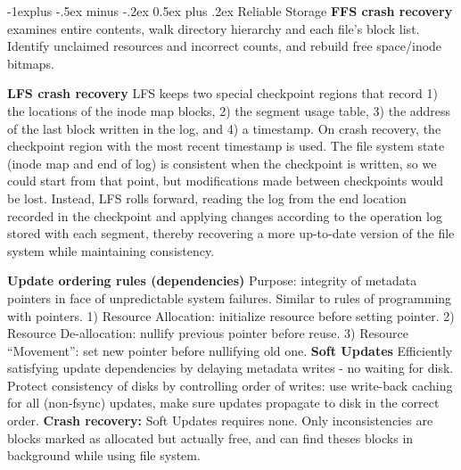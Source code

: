 \documentclass[6pt,landscape]{article}
\makeatletter
\renewcommand{\subsection}{\@startsection{subsection}{2}{0mm}%
                                {-1explus -.5ex minus -.2ex}%
                                {0.5ex plus .2ex}%
                                {\normalfont\normalsize\bfseries}}
\makeatother
\begin{document}
\begin{multicols}{3}
\subsection{Reliable Storage}
{\bf FFS crash recovery} examines entire contents, walk directory hierarchy and each file's block list. Identify unclaimed resources and incorrect counts, and rebuild free space/inode bitmaps.

{\bf LFS crash recovery} LFS keeps two special checkpoint regions that record 1) the locations of the inode map blocks, 2) the segment usage table, 3) the address of the last block written in the log, and 4) a timestamp. On crash recovery, the checkpoint region with the most recent timestamp is used. The file system state (inode map and end of log) is consistent when the checkpoint is written, so we could start from that point, but modifications made between checkpoints would be lost. Instead, LFS rolls forward, reading the log from the end location recorded in the checkpoint and applying changes according to the operation log stored with each segment, thereby recovering a more up-to-date version of the file system while maintaining consistency.

{\bf Update ordering rules (dependencies)} Purpose: integrity of metadata pointers in face of unpredictable system failures. Similar to rules of programming with pointers. 
1) Resource Allocation: initialize resource before setting pointer.
2) Resource De-allocation: nullify previous pointer before reuse.
3) Resource ``Movement'': set new pointer before nullifying old one.
{\bf Soft Updates} Efficiently satisfying update dependencies by delaying metadata writes - no waiting for disk. Protect consistency of disks by controlling order of writes: use write-back caching for all (non-fsync) updates, make sure updates propagate to disk in the correct order.
{\bf Crash recovery:} Soft Updates requires none. Only inconsistencies are blocks marked as allocated but actually free, and can find theses blocks in background while using file system.


\end{multicols}
\end{document}
